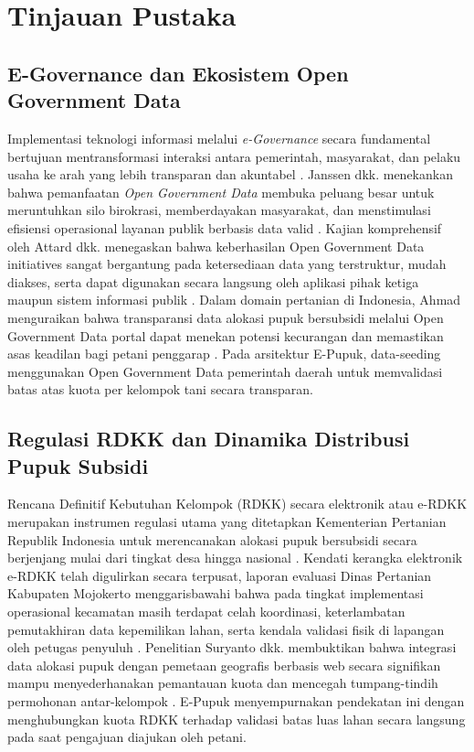 ﻿\documentclass[conference]{IEEEtran}
\begin{document}
\section{Tinjauan Pustaka}
\subsection{E-Governance dan Ekosistem Open Government Data}
Implementasi teknologi informasi melalui \textit{e-Governance} secara fundamental bertujuan mentransformasi interaksi antara pemerintah, masyarakat, dan pelaku usaha ke arah yang lebih transparan dan akuntabel \cite{b1}. Janssen dkk. menekankan bahwa pemanfaatan \textit{Open Government Data} membuka peluang besar untuk meruntuhkan silo birokrasi, memberdayakan masyarakat, dan menstimulasi efisiensi operasional layanan publik berbasis data valid \cite{b2}. Kajian komprehensif oleh Attard dkk. menegaskan bahwa keberhasilan Open Government Data initiatives sangat bergantung pada ketersediaan data yang terstruktur, mudah diakses, serta dapat digunakan secara langsung oleh aplikasi pihak ketiga maupun sistem informasi publik \cite{b3}. Dalam domain pertanian di Indonesia, Ahmad menguraikan bahwa transparansi data alokasi pupuk bersubsidi melalui Open Government Data portal dapat menekan potensi kecurangan dan memastikan asas keadilan bagi petani penggarap \cite{b6}. Pada arsitektur E-Pupuk, data-seeding menggunakan Open Government Data pemerintah daerah untuk memvalidasi batas atas kuota per kelompok tani secara transparan.

\subsection{Regulasi RDKK dan Dinamika Distribusi Pupuk Subsidi}
Rencana Definitif Kebutuhan Kelompok (RDKK) secara elektronik atau e-RDKK merupakan instrumen regulasi utama yang ditetapkan Kementerian Pertanian Republik Indonesia untuk merencanakan alokasi pupuk bersubsidi secara berjenjang mulai dari tingkat desa hingga nasional \cite{b4}. Kendati kerangka elektronik e-RDKK telah digulirkan secara terpusat, laporan evaluasi Dinas Pertanian Kabupaten Mojokerto menggarisbawahi bahwa pada tingkat implementasi operasional kecamatan masih terdapat celah koordinasi, keterlambatan pemutakhiran data kepemilikan lahan, serta kendala validasi fisik di lapangan oleh petugas penyuluh \cite{b5}. Penelitian Suryanto dkk. membuktikan bahwa integrasi data alokasi pupuk dengan pemetaan geografis berbasis web secara signifikan mampu menyederhanakan pemantauan kuota dan mencegah tumpang-tindih permohonan antar-kelompok \cite{b7}. E-Pupuk menyempurnakan pendekatan ini dengan menghubungkan kuota RDKK terhadap validasi batas luas lahan secara langsung pada saat pengajuan diajukan oleh petani.
\end{document}
